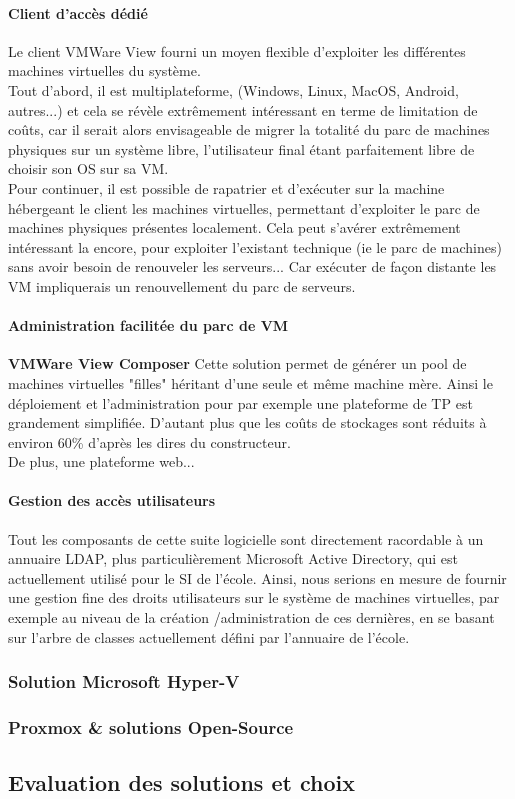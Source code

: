 \paragraph{Client d'accès dédié}
Le client VMWare View fourni un moyen flexible d'exploiter les différentes machines virtuelles du système.\\
Tout d'abord, il est multiplateforme, (Windows, Linux, MacOS, Android, autres...) et cela se révèle extrêmement intéressant en terme de limitation de coûts, car il serait alors envisageable de migrer la totalité du parc de machines physiques  sur un système libre, l'utilisateur final étant parfaitement libre de choisir son OS sur sa VM.\\ 
Pour continuer, il est possible de rapatrier et d'exécuter sur la machine hébergeant le client les machines virtuelles, permettant d'exploiter le parc de machines physiques présentes localement. Cela peut s'avérer extrêmement intéressant la encore, pour exploiter l'existant technique (ie le parc de machines) sans avoir besoin de renouveler les serveurs... Car exécuter de façon distante les VM impliquerais un renouvellement du parc de serveurs.\\

\paragraph{Administration facilitée du parc de VM}
\textbf{VMWare View Composer} Cette solution permet de générer un pool de machines virtuelles "filles" héritant d'une seule et même machine mère. Ainsi le déploiement et l'administration pour par exemple une plateforme de TP est grandement simplifiée. D'autant plus que les coûts de stockages sont réduits à environ 60\% d'après les dires du constructeur.\\
De plus, une plateforme web...%

\paragraph{Gestion des accès utilisateurs}
Tout les composants de cette suite logicielle sont directement racordable à un annuaire LDAP, plus particulièrement Microsoft Active Directory, qui est actuellement utilisé pour le SI de l'école. Ainsi, nous serions en mesure de fournir une gestion fine des droits utilisateurs sur le système de machines virtuelles, par exemple au niveau de la création /administration de ces dernières, en se basant sur l'arbre de classes actuellement défini par l'annuaire de l'école.

\subsubsection{Solution Microsoft Hyper-V}

\subsubsection{Proxmox \& solutions Open-Source}


\subsection{Evaluation des solutions et choix}
